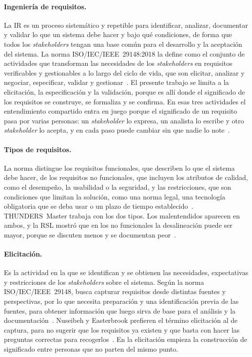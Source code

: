\documentclass[12pt,letterpaper,oneside]{report}
\begin{document}
\paragraph{Ingeniería de requisitos.}
La IR es un proceso sistemático y repetible para identificar, analizar,
documentar y validar lo que un sistema debe hacer y bajo qué condiciones, de
forma que todos los \textit{stakeholders} tengan una base común para el desarrollo y la
aceptación del sistema. La norma ISO/IEC/IEEE~29148:2018 la define como el
conjunto de actividades que transforman las necesidades de los \textit{stakeholders} en
requisitos verificables y gestionables a lo largo del ciclo de vida, que son
elicitar, analizar y negociar, especificar, validar y gestionar~\cite{iso29148}.
El presente trabajo se limita a la elicitación, la especificación y la
validación, porque es allí donde el significado de los requisitos se construye,
se formaliza y se confirma. En esas tres actividades el entendimiento compartido
entra en juego porque el significado de un requisito pasa por varias personas:
un \textit{stakeholder} lo expresa, un analista lo escribe y otro
\textit{stakeholder} lo acepta, y en cada paso puede cambiar sin que nadie lo
note~\cite{glinz2015shared}.

\paragraph{Tipos de requisitos.}
La norma distingue los requisitos funcionales, que describen lo que el sistema
debe hacer, de los requisitos no funcionales, que incluyen los atributos de
calidad, como el desempeño, la usabilidad o la seguridad, y las restricciones,
que son condiciones que limitan la solución, como una norma legal, una
tecnología obligatoria que se deba usar o un plazo de tiempo establecido~\cite{iso29148,iso25010}. THUNDERS~Master trabaja con los dos tipos. Los malentendidos aparecen en ambos,
y la RSL mostró que en los no funcionales la desalineación puede ser mayor,
porque se discuten menos y se documentan
peor~\cite{behutiye2022quality,okpara2023}.

\paragraph{Elicitación.}
Es la actividad en la que se identifican y se obtienen las necesidades,
expectativas y restricciones de los \textit{stakeholders} sobre el sistema.
Según la norma ISO/IEC/IEEE~29148, busca capturar requisitos desde distintas
fuentes y perspectivas, por lo que necesita preparación y una identificación
previa de las fuentes, para obtener información que luego sirva
de base para el análisis y la documentación~\cite{iso29148}. Nuseibeh y Easterbrook prefieren el término elicitación al de captura, para no
sugerir que los requisitos ya existen y que basta con hacer las preguntas
correctas para recogerlos~\cite{nuseibeh2000roadmap}. En la elicitación empieza
la construcción de significado entre personas que no parten del mismo punto.
\end{document}
